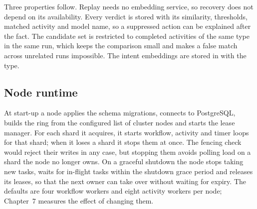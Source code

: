Three properties follow. Replay needs no embedding service, so recovery does
not depend on its availability. Every verdict is stored with its similarity,
thresholds, matched activity and model name, so a suppressed action can be
explained after the fact. The candidate set is restricted to completed
activities of the same type in the same run, which keeps the comparison small
and makes a false match across unrelated runs impossible. The intent
embeddings are stored in  with the  type.

\subsection{Node runtime}

At start-up a node applies the schema migrations, connects to PostgreSQL,
builds the ring from the configured list of cluster nodes and starts the
lease manager. For each shard it acquires, it starts workflow, activity and
timer loops for that shard; when it loses a shard it stops them at once. The
fencing check would reject their writes in any case, but stopping them avoids
polling load on a shard the node no longer owns. On a graceful shutdown the
node stops taking new tasks, waits for in-flight tasks within the shutdown
grace period and releases its leases, so that the next owner can take over
without waiting for expiry. The defaults are four workflow workers and eight
activity workers per node; Chapter~7 measures the effect of changing them.
